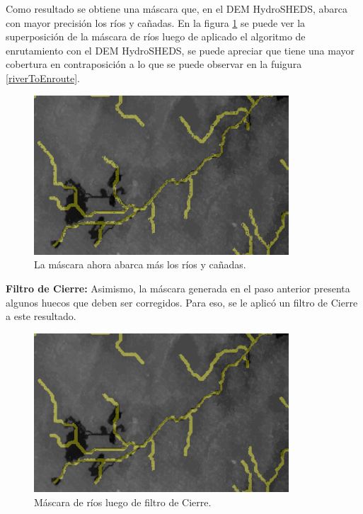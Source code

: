 \documentclass[10pt,a4paper, twoside]{report}
\begin{document}
Como resultado se obtiene una máscara que, en el DEM HydroSHEDS, abarca con mayor precisión los ríos y cañadas. En la figura \ref{riversEnrouted} se puede ver la superposición de la máscara de ríos luego de aplicado el algoritmo de enrutamiento con el DEM HydroSHEDS, se puede apreciar que tiene una mayor cobertura en contraposición a lo que se puede observar en la fuigura \ref{riverToEnroute}.


\begin{figure}[H]
   \centering      
   \includegraphics[width=0.85\textwidth]{imagenes/riversEnrouted.jpg}
 \caption{La máscara ahora abarca más los ríos y cañadas.}
 \label{riversEnrouted}
\end{figure}

\textbf{Filtro de Cierre:}  Asimismo, la máscara generada en el paso anterior presenta algunos huecos que deben ser corregidos. Para eso, se le aplicó un filtro de Cierre a este resultado.

\begin{figure}[H]
   \centering      
   \includegraphics[width=0.85\textwidth]{imagenes/riversEnroutedClosing.jpg}
 \caption{Máscara de ríos luego de filtro de Cierre.}
 \label{riversEnroutedClosing}
\end{figure}
\end{document}
